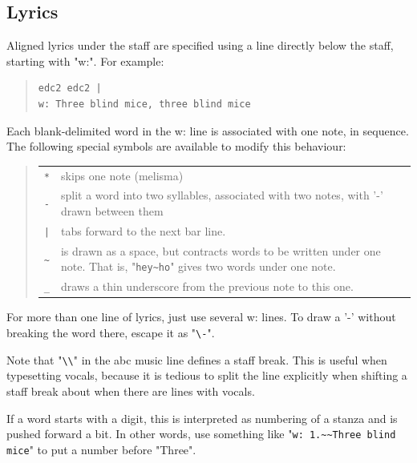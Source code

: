 \documentclass[a4paper]{article}
\begin{document}
\subsection{Lyrics}
Aligned lyrics under the staff are specified using a line directly
below the staff, starting with "w:". For example:
\begin{quote}
\begin{verbatim}
edc2 edc2 |
w: Three blind mice, three blind mice
\end{verbatim}
\end{quote}
Each blank-delimited word in the w: line is associated with
one note, in sequence. The following special symbols are available
to modify this behaviour:
\begin{quote}
\begin{tabular}{lp{12cm}}
\verb$*$ & skips one note (melisma)\\
\verb$-$ & split a word into two syllables, associated with two notes,
      with '-' drawn between them \\
\verb$|$ & tabs forward to the next bar line.\\
\verb$~$ & is drawn as a space, but contracts words to be written under
      one note. That is, "\verb$hey~ho$" gives two words under one note. \\
\verb$_$ & draws a thin underscore from the previous note to this one. \\
\end{tabular}
\end{quote}
For more than one line of lyrics, just use several w: lines.
To draw a '-' without breaking the word there, escape it as 
"\verb$\-$".
\par
Note that "\verb$\\$" in the abc music line defines a 
staff break. This is
useful when typesetting vocals, because it is tedious to split
the line explicitly when shifting a staff break about when there
are lines with vocals.
\par
If a word starts with a digit, this is interpreted as numbering of a
stanza and is pushed forward a bit. In other words, use something like 
"\verb$w: 1.~~Three blind mice$" 
to put a number before "Three".
\end{document}
